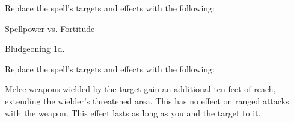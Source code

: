 Replace the spell's targets and effects with the following:
\begin{spellcontent}

\begin{augmenttargetinginfo}



\end{augmenttargetinginfo}


\begin{augmenteffects}




\begin{spellattack}{Spellpower vs. Fortitude}


\spellsuccess Bludgeoning  \minus1d.


\end{spellattack}





\end{augmenteffects}

\end{spellcontent}








Replace the spell's targets and effects with the following:
\begin{spellcontent}

\begin{augmenttargetinginfo}



\end{augmenttargetinginfo}


\begin{augmenteffects}



\spelleffect
Melee weapons wielded by the target gain an additional ten feet of reach, extending the wielder's threatened area.
This has no effect on ranged attacks with the weapon.
This effect lasts as long as you and the target  to it.








\end{augmenteffects}

\end{spellcontent}






